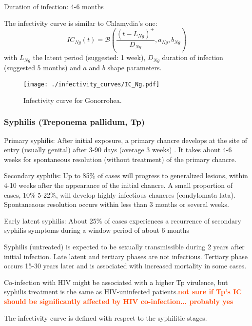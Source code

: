 \documentclass[11pt, onecolumn]{article}
\newcommand{\warning}[1]{\textbf{\textcolor{OrangeRed}{#1}}}
\begin{document}
 Duration of infection: 4-6 months \cite{Chen:2010hx,Korenromp:2002gt}
 
 The infectivity curve is similar to Chlamydia's one:
$$IC_{Ng}(t) = \mathcal{B}\left(\frac{(t-L_{Ng})^+}{D_{Ng}},a_{Ng},b_{Ng}\right)$$
with $L_{Ng}$ the latent period (suggested: 1 week), $D_{Ng}$ duration of infection (suggested 5 months) and $a$ and $b$ shape parameters.
\begin{figure}[!ht]
\centering
    \texttt{[image: ./infectivity\_curves/IC\_Ng.pdf]}
\caption{Infectivity curve for Gonorrohea.}
\label{fig:ICNg}
\end{figure} 
 
 
 \subsubsection{Syphilis (Treponema pallidum, Tp)}

Primary syphilis: After initial exposure, a primary chancre develops at the site of entry (usually genital) after 3-90 days (average 3 weeks) \cite{Kent:2008ch,Horvath:2011fw}. It takes about 4-6 weeks for spontaneous resolution (without treatment) of the primary chancre.

Secondary syphilis: Up to 85\% of cases will progress to generalized lesions\cite{Horvath:2011fw}, within 4-10 weeks after the appearance of the initial chancre\cite{Kent:2008ch,Horvath:2011fw}. A small proportion of cases, 10\%\cite{Horvath:2011fw} 5-22\%\cite{Kent:2008ch}, will develop highly infectious chancres (condylomata lata). Spontaneaous resolution occurs within less than 3 months\cite{Horvath:2011fw} or several weeks\cite{Kent:2008ch}.

Early latent syphilis: About 25\% of cases experiences a recurrence of secondary syphilis symptoms during a window period of about 6 months

Syphilis (untreated) is expected to be sexually transmissible during 2 years after initial infection\cite{Horvath:2011fw}. Late latent and tertiary phases are not infectious. Tertiary phase occurs 15-30 years later and is associated with increased mortality in some cases. 

Co-infection with HIV might be associated with a higher Tp virulence, but syphilis treatment is the same as HIV-uninfected patients\cite{Kent:2008ch}.\warning{not sure if Tp's IC should be significantly affected by HIV co-infection... probably yes}

The infectivity curve is defined with respect to the syphilitic stages.
\end{document}
